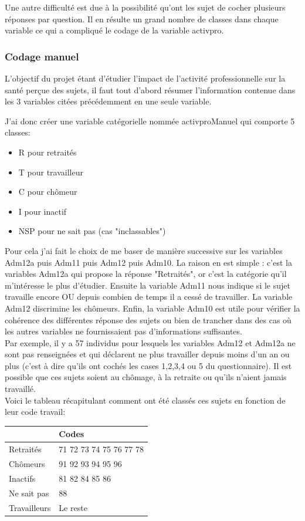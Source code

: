 \documentclass{book}
\begin{document}
\noindent
Une autre difficulté est due à la possibilité qu'ont les sujet de cocher plusieurs réponses par question. Il en résulte un grand nombre de classes dans chaque variable ce qui a compliqué le codage de la variable activpro.

\subsubsection{Codage manuel}
\noindent
L'objectif du projet étant d'étudier l'impact de l'activité professionnelle sur la santé perçue des sujets, il faut tout d'abord résumer l'information contenue dans les 3 variables citées précédemment en une seule variable.

\noindent
J'ai donc créer une variable catégorielle nommée activproManuel qui comporte 5 classes:
\begin{itemize}[label=\textbullet, font=\small \color{black} ]
\item R pour retraités
\item T pour travailleur
\item C pour chômeur
\item I pour inactif
\item NSP pour ne sait pas (cas "inclassables")
\end{itemize}

\noindent
Pour cela j'ai fait le choix de me baser de manière successive sur les variables Adm12a puis Adm11 puis Adm12 puis Adm10. La raison en est simple : c'est la variables Adm12a qui propose la réponse "Retraités", or c'est la catégorie qu'il m'intéresse le plus d'étudier. Ensuite la variable Adm11 nous indique si le sujet travaille encore OU depuis combien de temps il a cessé de travailler. La variable Adm12 discrimine les chômeurs. Enfin, la variable Adm10 est utile pour vérifier la cohérence des différentes réponse des sujets ou bien de trancher dans des cas où les autres variables ne fournissaient pas d'informations suffisantes.\\
Par exemple, il y a 57 individus pour lesquels les variables Adm12 et Adm12a ne sont pas renseignées et qui déclarent ne plus travailler depuis moins d'un an ou plus (c'est à dire qu'ils ont cochés les cases 1,2,3,4 ou 5 du questionnaire). Il est possible que ces sujets soient au chômage, à la retraite ou qu'ils n'aient jamais travaillé.\\
\newline
Voici le tableau récapitulant comment ont été classés ces sujets en fonction de leur code travail:\\
\begin{center}
\begin{tabular}{l|l}
 & Codes \\
 \hline
Retraités & 71 72 73 74 75 76 77 78\\
Chômeurs & 91 92 93 94 95 96\\
Inactifs & 81 82 84 85 86\\
Ne sait pas & 88\\
Travailleurs & Le reste
\end{tabular}
\end{center}
\end{document}
